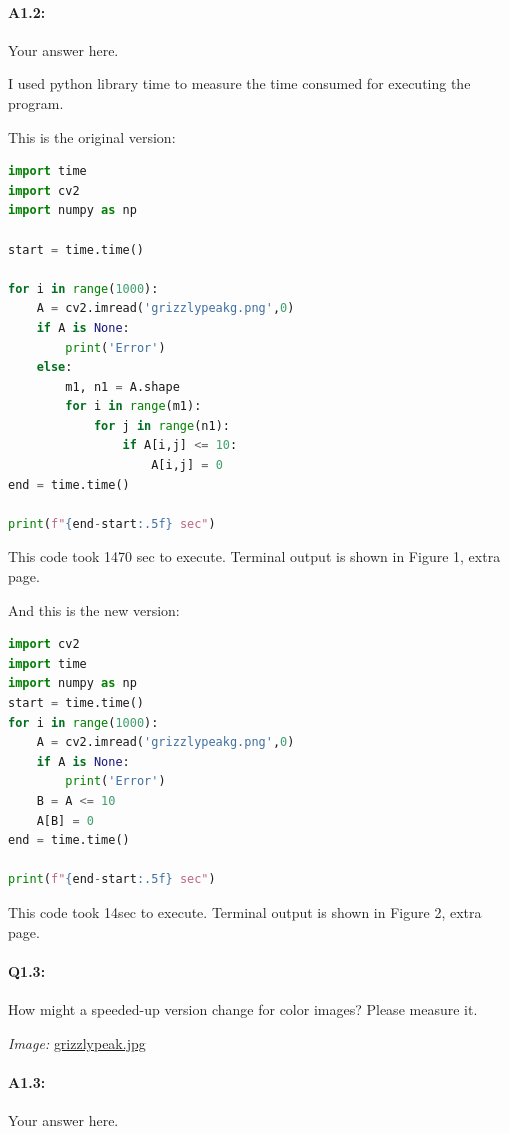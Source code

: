 \documentclass[11pt]{article}
\begin{document}
\paragraph{A1.2:} Your answer here.

I used python library time to measure the time consumed for executing the program. 

This is the original version:
\begin{lstlisting}[language=python]
import time
import cv2
import numpy as np

start = time.time()

for i in range(1000):
    A = cv2.imread('grizzlypeakg.png',0)
    if A is None:
        print('Error')
    else:
        m1, n1 = A.shape
        for i in range(m1):
            for j in range(n1): 
                if A[i,j] <= 10:
                    A[i,j] = 0
end = time.time()

print(f"{end-start:.5f} sec")
\end{lstlisting}
This code took 1470 sec to execute.
Terminal output is shown in Figure 1, extra page.

And this is the new version:
\begin{lstlisting}[language=python]
import cv2
import time
import numpy as np
start = time.time()
for i in range(1000):
    A = cv2.imread('grizzlypeakg.png',0)
    if A is None:
        print('Error')
    B = A <= 10
    A[B] = 0
end = time.time()

print(f"{end-start:.5f} sec")

\end{lstlisting}

This code took 14sec to execute.
Terminal output is shown in Figure 2, extra page.


\pagebreak
\paragraph{Q1.3:} How might a speeded-up version change for color images? Please measure it.

\emph{Image:} \href{grizzlypeak.jpg}{grizzlypeak.jpg}

\paragraph{A1.3:} Your answer here.
\end{document}
